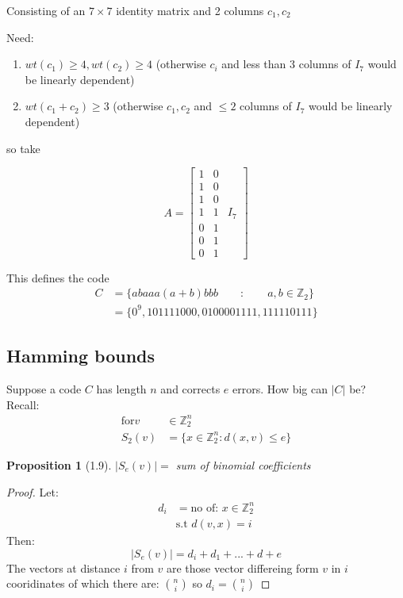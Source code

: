 \documentclass[amsfonts]{amsart}
\newtheorem{prop}[thm]{Proposition}
\theoremstyle{definition}
\theoremstyle{remark}
\numberwithin{equation}{section}
\begin{document}
	Consisting of an $7 \times 7$ identity matrix and 2 columns $c_1, c_2$

	Need:
	\begin{enumerate}
		\item $wt(c_1)\geq 4, wt(c_2)\geq 4$ (otherwise $c_i$ and less than 3 columns of $I_7$ would be linearly dependent)
		\item $wt(c_1+ c_2) \geq 3$ (otherwise $c_1, c_2$ and $\leq 2$ columns of $I_7$ would be linearly dependent)	
	\end{enumerate}
	so take 

	\begin{equation*}
		A = \begin{bmatrix}
			1 & 0 \\
			1 & 0 \\
			1 & 0 \\
			1 & 1 & I_7 \\
			0 & 1 \\
			0 & 1 \\
			0 & 1 

			\end{bmatrix}
	\end{equation*}

	This defines the code
	\begin{align*}
		C &= \{ a b a a a (a +b)  b b b \qquad: \qquad a,b \in \mathbb{Z}_2 \} \\
		  &= \{0^9, 101111000, 0100001111, 111110111\}
	\end{align*}

\subsection{Hamming bounds}

Suppose a code $C$ has length $n$ and corrects $e$ errors. How big can $|C|$ be?\\

Recall: 
\begin{align*}
	\text{for} v &\in \mathbb{Z}_2^n \\
		S_2(v) &= \{x \in \mathbb{Z}_2^n: d(x,v)\leq e\}
\end{align*}

\begin{prop}[1.9]
	$|S_e(v)| = $ sum of binomial coefficients %
\end{prop}

\begin{proof}
	Let:
	\begin{align*}
		d_i &= \text{no of: } x\in \mathbb{Z}_2^n \\
			&\text{s.t } d(v,x) = i
	\end{align*}
	Then:
	\[ |S_e(v)| = d_i + d_1 + ... + d+e\]
	The vectors at distance $i$ from $v$ are those vector differeing form $v$ in $i$ cooridinates of which there are: ${n \choose i}$ so $d_i = {n \choose i}$
\end{proof}
\end{document}
